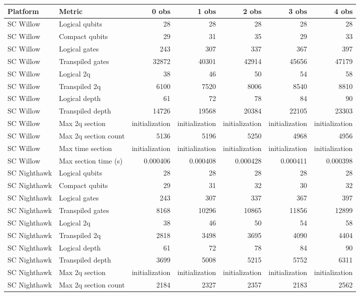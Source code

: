 \begin{table}
\centering
\scriptsize
\begin{tabular}{llrrrrr}
\hline
Platform & Metric & 0 obs & 1 obs & 2 obs & 3 obs & 4 obs \\
\hline
SC Willow & Logical qubits & 28 & 28 & 28 & 28 & 28 \\
SC Willow & Compact qubits & 29 & 31 & 35 & 29 & 33 \\
SC Willow & Logical gates & 243 & 307 & 337 & 367 & 397 \\
SC Willow & Transpiled gates & 32872 & 40301 & 42914 & 45656 & 47179 \\
SC Willow & Logical 2q & 38 & 46 & 50 & 54 & 58 \\
SC Willow & Transpiled 2q & 6100 & 7520 & 8006 & 8540 & 8810 \\
SC Willow & Logical depth & 61 & 72 & 78 & 84 & 90 \\
SC Willow & Transpiled depth & 14726 & 19568 & 20384 & 22105 & 23303 \\
SC Willow & Max 2q section & initialization & initialization & initialization & initialization & initialization \\
SC Willow & Max 2q section count & 5136 & 5196 & 5250 & 4968 & 4956 \\
SC Willow & Max time section & initialization & initialization & initialization & initialization & initialization \\
SC Willow & Max section time (s) & 0.000406 & 0.000408 & 0.000428 & 0.000411 & 0.000398 \\
\hline
SC Nighthawk & Logical qubits & 28 & 28 & 28 & 28 & 28 \\
SC Nighthawk & Compact qubits & 29 & 31 & 32 & 30 & 32 \\
SC Nighthawk & Logical gates & 243 & 307 & 337 & 367 & 397 \\
SC Nighthawk & Transpiled gates & 8168 & 10296 & 10865 & 11856 & 12899 \\
SC Nighthawk & Logical 2q & 38 & 46 & 50 & 54 & 58 \\
SC Nighthawk & Transpiled 2q & 2818 & 3498 & 3695 & 4090 & 4404 \\
SC Nighthawk & Logical depth & 61 & 72 & 78 & 84 & 90 \\
SC Nighthawk & Transpiled depth & 3699 & 5008 & 5215 & 5752 & 6311 \\
SC Nighthawk & Max 2q section & initialization & initialization & initialization & initialization & initialization \\
SC Nighthawk & Max 2q section count & 2184 & 2327 & 2357 & 2183 & 2562 \\

\end{tabular}
\end{table}
